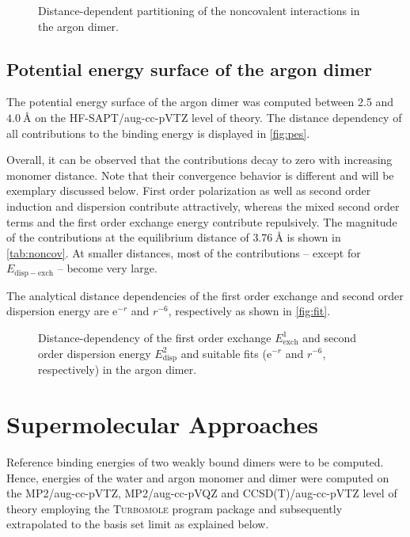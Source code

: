 \documentclass[a4paper,12pt]{scrartcl}
\newcommand{\m}[1]{\mathrm{#1}}
\begin{document}
\begin{figure}
	\centering
	
	\vspace{-20pt}
	\caption{Distance-dependent partitioning of the noncovalent interactions in the argon dimer.}
	\label{fig:pes}
\end{figure}



\subsection{Potential energy surface of the argon dimer}
%
The potential energy surface of the argon dimer was computed between 2.5 and $ \SI{4.0}{\angstrom} $ on the HF-SAPT/aug-cc-pVTZ level of theory. The distance dependency of all contributions to the binding energy is displayed in \autoref{fig:pes}.

Overall, it can be observed that the contributions decay to zero with increasing monomer distance. Note that their convergence behavior is different and will be exemplary discussed below. First order polarization as well as second order induction and dispersion contribute attractively, whereas the mixed second order terms and the first order exchange energy contribute repulsively. The magnitude of the contributions at the equilibrium distance of $ \SI{3.76}{\angstrom} $ is shown in \autoref{tab:noncov}. At smaller distances, most of the contributions -- except for $E_\m{disp-exch} $ -- become very large.

The analytical distance dependencies of the first order exchange and second order dispersion energy are $ \m{e}^{-r} $ and $ r^{-6} $, respectively as shown in \autoref{fig:fit}.

\begin{figure}
	\centering
	
	\vspace{-20pt}
	\caption{Distance-dependency of the first order exchange $ E^1_\m{exch} $ and second order dispersion energy $ E^2_\m{disp} $ and suitable fits ($ \m{e}^{-r} $ and $ r^{-6} $, respectively) in the argon dimer.}
	\label{fig:fit}
\end{figure}
%
\section{Supermolecular Approaches}
%
Reference binding energies of two weakly bound dimers were to be computed. Hence, energies of the water and argon monomer and dimer were computed on the MP2/aug-cc-pVTZ, MP2/aug-cc-pVQZ and CCSD(T)/aug-cc-pVTZ level of theory employing the \textsc{Turbomole}\autocite[]{turbomole1,turbomole2} program package and subsequently extrapolated to the basis set limit as explained below.
\end{document}
